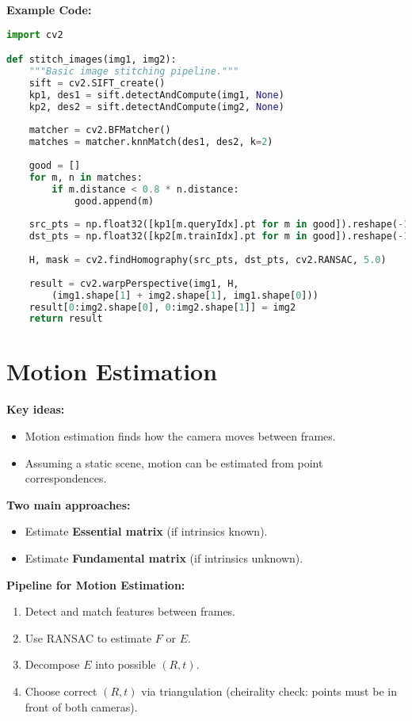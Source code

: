 \documentclass[a4paper,11pt]{article}
\begin{document}
\textbf{Example Code:}
\begin{lstlisting}[language=Python]
import cv2

def stitch_images(img1, img2):
    """Basic image stitching pipeline."""
    sift = cv2.SIFT_create()
    kp1, des1 = sift.detectAndCompute(img1, None)
    kp2, des2 = sift.detectAndCompute(img2, None)
    
    matcher = cv2.BFMatcher()
    matches = matcher.knnMatch(des1, des2, k=2)
    
    good = []
    for m, n in matches:
        if m.distance < 0.8 * n.distance:
            good.append(m)
    
    src_pts = np.float32([kp1[m.queryIdx].pt for m in good]).reshape(-1,1,2)
    dst_pts = np.float32([kp2[m.trainIdx].pt for m in good]).reshape(-1,1,2)
    
    H, mask = cv2.findHomography(src_pts, dst_pts, cv2.RANSAC, 5.0)
    
    result = cv2.warpPerspective(img1, H, 
        (img1.shape[1] + img2.shape[1], img1.shape[0]))
    result[0:img2.shape[0], 0:img2.shape[1]] = img2
    return result
\end{lstlisting}

\newpage
\section{Motion Estimation}

\textbf{Key ideas:}
\begin{itemize}
    \item Motion estimation finds how the camera moves between frames.
    \item Assuming a static scene, motion can be estimated from point correspondences.
\end{itemize}

\textbf{Two main approaches:}
\begin{itemize}
    \item Estimate \textbf{Essential matrix} (if intrinsics known).
    \item Estimate \textbf{Fundamental matrix} (if intrinsics unknown).
\end{itemize}

\textbf{Pipeline for Motion Estimation:}
\begin{enumerate}
    \item Detect and match features between frames.
    \item Use RANSAC to estimate $F$ or $E$.
    \item Decompose $E$ into possible $(R, t)$.
    \item Choose correct $(R, t)$ via triangulation (cheirality check: points must be in front of both cameras).
\end{enumerate}
\end{document}
